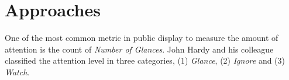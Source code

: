 




\section{Approaches}
One of the most common metric in public display to measure the amount of attention is the count of \emph{Number of Glances}. John Hardy and his colleague \cite{glancingcount} classified the attention level in three categories, (1) \emph{Glance}, (2) \emph{Ignore} and (3) \emph{Watch}. 

